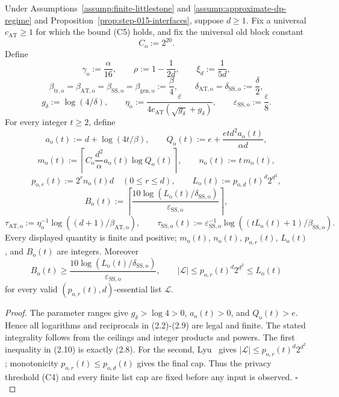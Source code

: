 \begin{lemma}\label{lem:step-015-dictionary}
Under Assumptions~\ref{assump:finite-littlestone} and
\ref{assump:approximate-dp-regime} and
Proposition~\ref{prop:step-015-interfaces}, suppose \(d\ge1\). Fix a universal
\(c_{\mathrm{AT}}\ge1\) for which the bound (C5) holds, and
fix the universal old block constant
\[
C_{\mathrm o}:=2^{20}.
\tag{2.1}
\]
Define
\[
\gamma_{\mathrm o}:=\frac{\alpha}{16},\qquad
\rho:=1-\frac1{2d},\qquad \xi_d:=\frac1{5d},
\tag{2.2}
\]
\[
\beta_{\mathrm{tr,o}}=\beta_{\mathrm{AT,o}}
=\beta_{\mathrm{SS,o}}=\beta_{\mathrm{gen,o}}:=\frac\beta4,
\qquad
\delta_{\mathrm{AT,o}}=\delta_{\mathrm{SS,o}}:=\frac\delta2,
\tag{2.3}
\]
\[
g_\delta:=\log(4/\delta),\qquad
\eta_{\mathrm o}:=
\frac{\varepsilon}
{4c_{\mathrm{AT}}(\sqrt{g_\delta}+g_\delta)},\qquad
\varepsilon_{\mathrm{SS,o}}:=\frac\varepsilon8.
\tag{2.4}
\]
For every integer \(t\ge2\), define
\[
a_{\mathrm o}(t):=d+\log(4t/\beta),\qquad
Q_{\mathrm o}(t):=
e+\frac{etd^2a_{\mathrm o}(t)}{\alpha d},
\tag{2.5}
\]
\[
m_{\mathrm o}(t):=
\left\lceil C_{\mathrm o}\frac{d^2}{\alpha}
a_{\mathrm o}(t)\log Q_{\mathrm o}(t)\right\rceil,\qquad
n_{\mathrm o}(t):=t\,m_{\mathrm o}(t),
\tag{2.6}
\]
\[
p_{\mathrm o,r}(t):=2^rn_{\mathrm o}(t)d
\quad(0\le r\le d),\qquad
L_{\mathrm o}(t):=p_{\mathrm o,d}(t)^d2^{d^2},
\tag{2.7}
\]
\[
B_{\mathrm o}(t):=
\left\lceil
\frac{10\log(L_{\mathrm o}(t)/\delta_{\mathrm{SS,o}})}
{\varepsilon_{\mathrm{SS,o}}}\right\rceil,
\tag{2.8}
\]
\[
\tau_{\mathrm{AT,o}}:=
\eta_{\mathrm o}^{-1}
\log((d+1)/\beta_{\mathrm{AT,o}}),\qquad
\tau_{\mathrm{SS,o}}(t):=
\varepsilon_{\mathrm{SS,o}}^{-1}
\log((tL_{\mathrm o}(t)+1)/\beta_{\mathrm{SS,o}}).
\tag{2.9}
\]
Every displayed quantity is finite and positive; \(m_{\mathrm o}(t)\),
\(n_{\mathrm o}(t)\), \(p_{\mathrm o,r}(t)\), \(L_{\mathrm o}(t)\), and
\(B_{\mathrm o}(t)\) are integers. Moreover
\[
B_{\mathrm o}(t)\ge
\frac{10\log(L_{\mathrm o}(t)/\delta_{\mathrm{SS,o}})}
{\varepsilon_{\mathrm{SS,o}}},
\qquad
|\mathcal L|\le p_{\mathrm o,r}(t)^d2^{d^2}
\le L_{\mathrm o}(t)
\tag{2.10}
\]
for every valid \((p_{\mathrm o,r}(t),d)\)-essential list
\(\mathcal L\).


\end{lemma}

\begin{proof}
The parameter ranges give \(g_\delta>\log4>0\),
\(a_{\mathrm o}(t)>0\), and \(Q_{\mathrm o}(t)>e\). Hence all logarithms
and reciprocals in (2.2)-(2.9) are legal and finite. The stated
integrality follows from the ceilings and integer products and powers.
The first inequality in (2.10) is exactly (2.8). For the second,
Lyu~\citep[Lemma~4.1 and Corollary~4.1]{lyu2025} gives
\(|\mathcal L|\le p_{\mathrm o,r}(t)^d2^{d^2}\); monotonicity
\(p_{\mathrm o,r}(t)\le p_{\mathrm o,d}(t)\) gives the final cap.
Thus the privacy threshold (C4) and every finite list cap are fixed
before any input is observed. \(\square\)


\end{proof}

